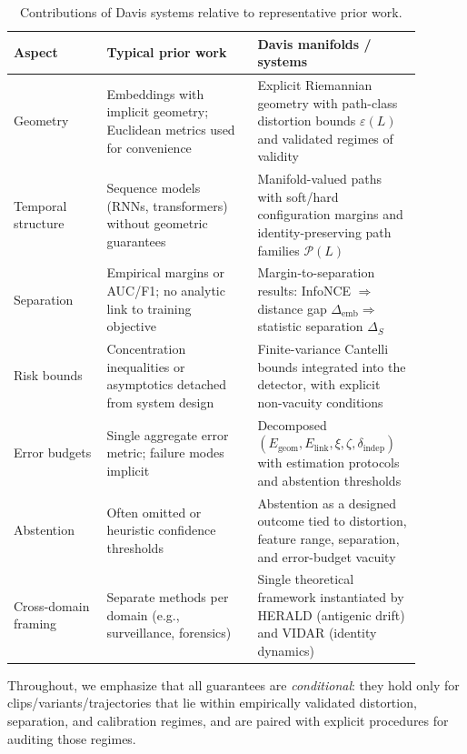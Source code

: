\documentclass[11pt]{article}
\theoremstyle{remark}
\theoremstyle{plain}
\begin{document}
\begin{table}[H]
    \centering
    \caption{Contributions of Davis systems relative to representative prior work.}
    \label{tab:contrib-vs-prior}
    \begin{tabularx}{\linewidth}{@{}p{0.21\linewidth}p{0.34\linewidth}p{0.34\linewidth}@{}}
        \toprule
        \textbf{Aspect} & \textbf{Typical prior work} & \textbf{Davis manifolds / systems} \\
        \midrule
        Geometry & Embeddings with implicit geometry; Euclidean metrics used for convenience & Explicit Riemannian geometry with path-class distortion bounds $\varepsilon(L)$ and validated regimes of validity \\
        \addlinespace[2pt]
        Temporal structure & Sequence models (RNNs, transformers) without geometric guarantees & Manifold-valued paths with soft/hard configuration margins and identity-preserving path families $\mathcal{P}(L)$ \\
        \addlinespace[2pt]
        Separation & Empirical margins or AUC/F1; no analytic link to training objective & Margin-to-separation results: InfoNCE $\Rightarrow$ distance gap $\Delta_{\text{emb}} \Rightarrow$ statistic separation $\Delta_S$ \\
        \addlinespace[2pt]
        Risk bounds & Concentration inequalities or asymptotics detached from system design & Finite-variance Cantelli bounds integrated into the detector, with explicit non-vacuity conditions \\
        \addlinespace[2pt]
        Error budgets & Single aggregate error metric; failure modes implicit & Decomposed $(E_{\text{geom}}, E_{\text{link}}, \xi, \zeta, \delta_{\text{indep}})$ with estimation protocols and abstention thresholds \\
        \addlinespace[2pt]
        Abstention & Often omitted or heuristic confidence thresholds & Abstention as a designed outcome tied to distortion, feature range, separation, and error-budget vacuity \\
        \addlinespace[2pt]
        Cross-domain framing & Separate methods per domain (e.g., surveillance, forensics) & Single theoretical framework instantiated by HERALD (antigenic drift) and VIDAR (identity dynamics) \\
        \bottomrule
    \end{tabularx}
\end{table}

Throughout, we emphasize that all guarantees are \emph{conditional}: they hold only for clips/variants/trajectories that lie within empirically validated distortion, separation, and calibration regimes, and are paired with explicit procedures for auditing those regimes.
\end{document}
